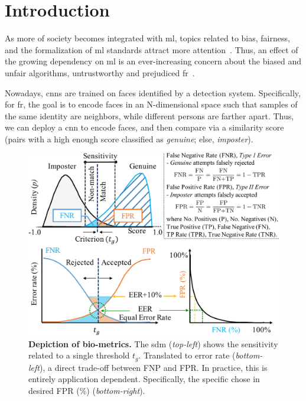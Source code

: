 
\glsresetall
\section{Introduction}
    As more of society becomes integrated with \gls{ml}, topics related to bias, fairness, and the formalization of \gls{ml} standards attract more attention~\cite{10.1007/978-3-030-13469-3_68, anne2018women, wang2018racial}. Thus, an effect of the growing dependency on \gls{ml} is an ever-increasing concern about the biased and unfair algorithms, \eg untrustworthy and prejudiced \gls{fr}~\cite{nagpal2019deep,snow2018}.
    


    Nowadays, \glspl{cnn} are trained on faces identified by a detection system. Specifically, for \gls{fr}, the goal is to encode faces in an N-dimensional space such that samples of the same identity are neighbors, while different persons are farther apart. Thus, we can deploy a \gls{cnn} to encode faces, and then compare via a similarity score (\ie pairs with a high enough score classified as \emph{genuine}; else, \emph{imposter}). 

\begin{figure}
    \centering
    \includegraphics[width=\linewidth]{figures/fig1-crop.pdf}
    \caption{\small{\textbf{Depiction of bio-metrics.} The \gls{sdm} (\emph{top-left}) shows the sensitivity related to a single threshold $t_g$. Translated to error rate (\emph{bottom-left}), a direct trade-off between FNP and FPR. In practice, this is entirely application dependent. Specifically, the specific chose in desired FPR (\%) (\emph{bottom-right}).}}
    \label{fig:biometrics}
\end{figure}

